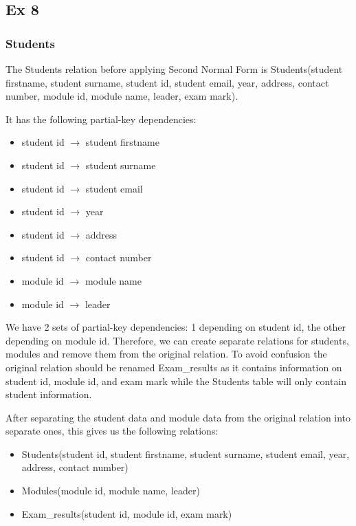 \subsection*{Ex 8}

\subsubsection*{Students}
The Students relation before applying Second Normal Form is Students(student firstname, student surname, student id, student email, year, address, contact number, module id, module name, leader, exam mark).


It has the following partial-key dependencies:

\begin{itemize}
    \item student id $\rightarrow$ student firstname
    \item student id $\rightarrow$ student surname
    \item student id $\rightarrow$ student email
    \item student id $\rightarrow$ year
    \item student id $\rightarrow$ address
    \item student id $\rightarrow$ contact number
    \item module id $\rightarrow$ module name
    \item module id $\rightarrow$ leader
\end{itemize}

We have 2 sets of partial-key dependencies: 1 depending on student id, the other depending on module id. 
Therefore, we can create separate relations for students, modules and remove them from the original relation. To avoid confusion the original relation should be renamed Exam_results as it contains information on student id, module id, and exam mark while the Students table will only contain student information.

After separating the student data and module data from the original relation into separate ones, this gives us the following relations:

\begin{itemize}
    \item Students(student id, student firstname, student surname, student email, year, address, contact number) 
    \item Modules(module id, module name, leader)
    \item Exam_results(student id, module id, exam mark) 
\end{itemize}


